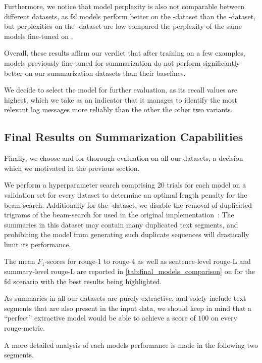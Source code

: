 Furthermore, we notice that model perplexity is also not comparable between different datasets,
as \ac{fsl} models perform better on the \logsummary{}-dataset than the \hadoop{}-dataset,
but perplexities on the \hadoop{}-dataset are low compared the perplexity of the same models fine-tuned on \logsummary{}.

Overall, these results affirm our verdict
that after training on a few examples,
models previously fine-tuned for summarization do not perform significantly
better on our summarization datasets
than their baselines.

We decide to select the  model for further evaluation,
as its recall values are highest,
which we take as an indicator that it manages to identify the most relevant log messages more reliably than the other the other two variants.

\subsection{Final Results on Summarization Capabilities}

Finally, we choose  and  for thorough evaluation on all our datasets,
a decision which we motivated in the previous section.

We perform a hyperparameter search comprising 20 trials for each model on a validation set for every dataset
to determine an optimal length penalty for the beam-search.
Additionally for the \hadoop{}-dataset,
we disable the removal of duplicated trigrams of the beam-search for  used in the original implementation~\parencite[7876]{bart}:
The summaries in this dataset may contain many duplicated text segments,
and prohibiting the model from generating such duplicate sequences will drastically limit its performance.

The mean \(F_1\)-scores for \acs*{rouge}-1 to \acs*{rouge}-4
as well as sentence-level \acs*{rouge}-L and summary-level \acs*{rouge}-L
are reported in \autoref{tab:final_models_comparison} on  for the \ac{fsl} scenario
with the best results being highlighted.

As summaries in all our datasets are purely extractive,
and solely include text segments that are also present in the input data,
we should keep in mind that a \enquote{perfect} extractive model would be able to achieve
a score of \(100\) on every \acs*{rouge}-metric.

A more detailed analysis of each models performance is made in the following two segments.

